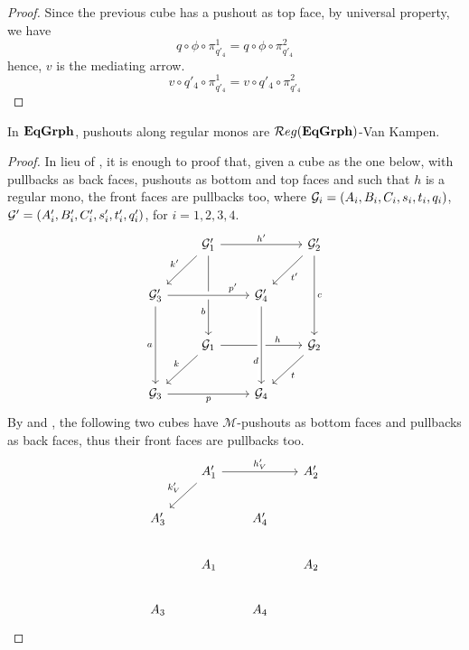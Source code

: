 \begin{proof}
	Since the previous cube has a pushout as top face, by universal property, we have
	\[
		q \circ \phi \circ \pi_{q'_4}^1 = q \circ \phi \circ \pi_{q'_4}^2
	\]
	hence, $v$ is the mediating arrow.
	\[
		v \circ q'_4 \circ \pi_{q'_4}^1 = v \circ q'_4 \circ \pi_{q'_4}^2
	\]
\end{proof}


\begin{lemma}\label{lemma:van_kampen}
	In $\mathbf{EqGrph}$, pushouts along regular monos are $\mathcal{R}eg(\mathbf{EqGrph})$-Van Kampen.
\end{lemma}

\begin{proof}
	In lieu of , it is enough to proof that, given a cube as the one below, with pullbacks as back faces, pushouts as bottom and top faces and such that $h$ is a regular mono, the front faces are pullbacks too, where $\mathcal{G}_i = (A_i, B_i, C_i, s_i, t_i, q_i)$, $\mathcal{G}'=(A_i', B_i', C_i', s_i', t_i', q_i')$, for $i = 1, 2, 3, 4$.
        \[\begin{tikzcd}[row sep=23, column sep =23]
        & {\mathcal{G}_1'} && {\mathcal{G}_2'} \\
        {\mathcal{G}_3'} && {\mathcal{G}_4'} \\
        & {\mathcal{G}_1} && {\mathcal{G}_2} \\
        {\mathcal{G}_3} && {\mathcal{G}_4}
        \arrow["{h'}", from=1-2, to=1-4]
        \arrow["{k'}"', from=1-2, to=2-1]
        \arrow["b"'{pos=0.7}, from=1-2, to=3-2]
        \arrow["{t'}", from=1-4, to=2-3]
        \arrow["c", from=1-4, to=3-4]
        \arrow["{p'}"{pos=0.8}, from=2-1, to=2-3, crossing over]
        \arrow["a"', from=2-1, to=4-1]
        \arrow["h"{pos=0.7}, from=3-2, to=3-4]
        \arrow["d"'{pos=0.7}, from=2-3, to=4-3, crossing over]
        \arrow["k"', from=3-2, to=4-1]
        \arrow["t", from=3-4, to=4-3]
        \arrow["p"', from=4-1, to=4-3]
        \end{tikzcd}\]
        By  and , the following two cubes have $\mathcal{M}$-pushouts as bottom faces and pullbacks as back faces, thus their front faces are pullbacks too.
        \[\begin{tikzcd}[row sep=20, column sep = 20]
        & {A_1'} && {A_2'} \\
        {A_3'} && {A_4'} \\
        & {A_1} && {A_2} \\
        {A_3} && {A_4}
        \arrow["{h'_V}", from=1-2, to=1-4]
        \arrow["{k'_V}"', from=1-2, to=2-1]

\end{tikzcd}\]
\end{proof}
